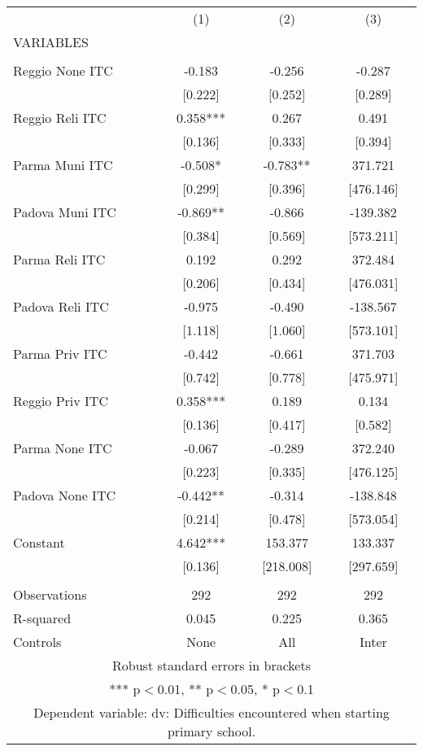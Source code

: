 \begin{tabular}{lccc} \hline
 & (1) & (2) & (3) \\
VARIABLES &  &  &  \\ \hline
 &  &  &  \\
Reggio None ITC & -0.183 & -0.256 & -0.287 \\
 & [0.222] & [0.252] & [0.289] \\
Reggio Reli ITC & 0.358*** & 0.267 & 0.491 \\
 & [0.136] & [0.333] & [0.394] \\
Parma Muni ITC & -0.508* & -0.783** & 371.721 \\
 & [0.299] & [0.396] & [476.146] \\
Padova Muni ITC & -0.869** & -0.866 & -139.382 \\
 & [0.384] & [0.569] & [573.211] \\
Parma Reli ITC & 0.192 & 0.292 & 372.484 \\
 & [0.206] & [0.434] & [476.031] \\
Padova Reli ITC & -0.975 & -0.490 & -138.567 \\
 & [1.118] & [1.060] & [573.101] \\
Parma Priv ITC & -0.442 & -0.661 & 371.703 \\
 & [0.742] & [0.778] & [475.971] \\
Reggio Priv ITC & 0.358*** & 0.189 & 0.134 \\
 & [0.136] & [0.417] & [0.582] \\
Parma None ITC & -0.067 & -0.289 & 372.240 \\
 & [0.223] & [0.335] & [476.125] \\
Padova None ITC & -0.442** & -0.314 & -138.848 \\
 & [0.214] & [0.478] & [573.054] \\
Constant & 4.642*** & 153.377 & 133.337 \\
 & [0.136] & [218.008] & [297.659] \\
 &  &  &  \\
Observations & 292 & 292 & 292 \\
R-squared & 0.045 & 0.225 & 0.365 \\
 Controls & None & All & Inter \\ \hline
\multicolumn{4}{c}{ Robust standard errors in brackets} \\
\multicolumn{4}{c}{ *** p$<$0.01, ** p$<$0.05, * p$<$0.1} \\
\multicolumn{4}{c}{ Dependent variable: dv: Difficulties encountered when starting primary school.} \\
\end{tabular}
